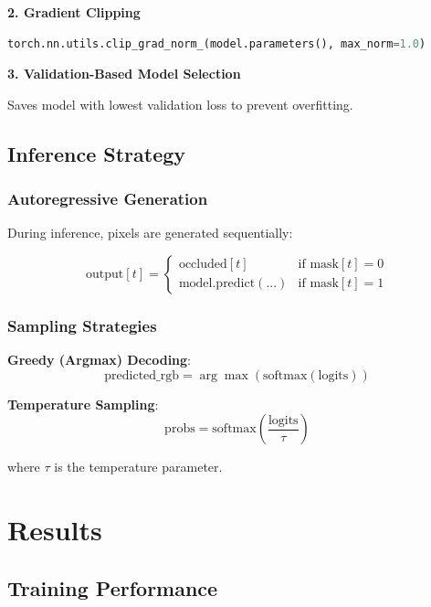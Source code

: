 \documentclass[12pt,a4paper]{article}
\begin{document}
\textbf{2. Gradient Clipping}

\begin{lstlisting}[language=Python]
torch.nn.utils.clip_grad_norm_(model.parameters(), max_norm=1.0)
\end{lstlisting}

\textbf{3. Validation-Based Model Selection}

Saves model with lowest validation loss to prevent overfitting.

\subsection{Inference Strategy}

\subsubsection{Autoregressive Generation}

During inference, pixels are generated sequentially:

\begin{equation}
\text{output}[t] = \begin{cases} 
\text{occluded}[t] & \text{if mask}[t] = 0 \\
\text{model.predict}(...) & \text{if mask}[t] = 1
\end{cases}
\end{equation}

\subsubsection{Sampling Strategies}

\textbf{Greedy (Argmax) Decoding}:
\begin{equation}
\text{predicted\_rgb} = \arg\max(\text{softmax}(\text{logits}))
\end{equation}

\textbf{Temperature Sampling}:
\begin{equation}
\text{probs} = \text{softmax}\left(\frac{\text{logits}}{\tau}\right)
\end{equation}

where $\tau$ is the temperature parameter.

\section{Results}

\subsection{Training Performance}
\end{document}
